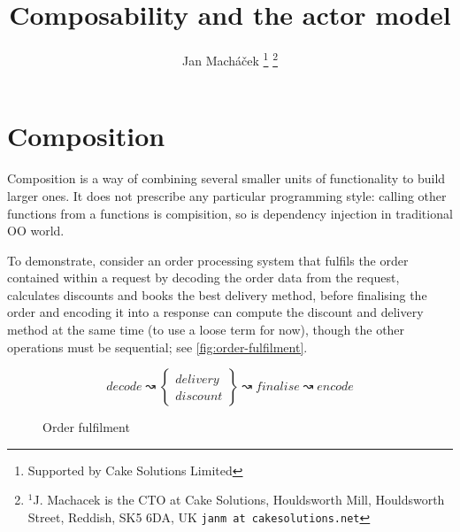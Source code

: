 



\title{Composability and the actor model}

\author{Jan Mach{\'a}\v{c}ek%
\thanks{Supported by Cake Solutions Limited}%
\thanks{$^{1}$J. Machacek is the CTO at Cake Solutions, Houldsworth Mill, Houldsworth Street, Reddish, SK5 6DA, UK {\tt\small janm at cakesolutions.net}}%
}



\twocolumn[
  \begin{@twocolumnfalse}
    \maketitle
    \begin{abstract}
      
    \end{abstract}
  \end{@twocolumnfalse}
]

\section{Composition}
Composition is a way of combining several smaller units of functionality to build larger ones. It does not prescribe any particular programming style: calling other functions from a functions is compisition, so is dependency injection in traditional OO world.

To demonstrate, consider an order processing system that fulfils the order contained within a request by decoding the order data from the request, calculates discounts and books the best delivery method, before finalising the order and encoding it into a response can compute the discount and delivery method at the same time (to use a loose term for now), though the other operations must be sequential; see \autoref{fig:order-fulfilment}.

\begin{figure}[h]
  \DontPrintSemicolon
  
  \[ 
    decode \rightwavearrow
    \left \{\begin{array}{l}
      delivery \\ discount
      \end{array}
    \right \} \rightwavearrow finalise \rightwavearrow encode
  \]
  \caption{Order fulfilment}
  \label{fig:order-fulfilment}
\end{figure} 

